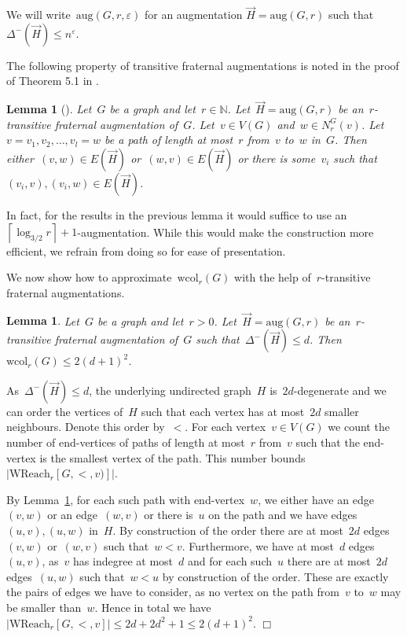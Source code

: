 \documentclass[11pt]{article}
\newtheorem{lemma}[theorem]{Lemma}
\numberwithin{equation}{section}
\newcommand{\N}{{\mathbb N}} \newcommand{\Q}{{\mathbb Q}}
\newcommand{\aug}{\mathrm{aug}}
\newcommand{\wcol}{\mathrm{wcol}}
\newcommand{\wreach}{\mathrm{WReach}}
\renewcommand{\epsilon}{\varepsilon}
\def\qed{\hspace*{\fill}$\Box$}
\newenvironment{proof}[1][]%
{\ifthenelse{\equal{#1}{}}{\noindent\textit{Proof.
    }}{\noindent\textit{#1. }}}%
{\qed\par\smallskip}
\begin{document}
We will write~$\aug(G,r,\epsilon)$ for an augmentation
$\vec{H}=\aug(G,r)$ such that~$\Delta^-(\vec{H})\leq n^\epsilon$.

The following property of transitive fraternal augmentations is noted
in the proof of Theorem 5.1 in \cite{NesetrilO05}.

\begin{lemma}[\cite{NesetrilO05}]\label{thm:augmentationneighbourhood}
  Let~$G$ be a graph and let~$r\in\N$. Let~$\vec{H}=\aug(G,r)$ be
  an~$r$-transitive fraternal augmentation of~$G$. Let~$v\in V(G)$
  and~$w\in N_r^G(v)$. Let~$v=v_1, v_2,\ldots, v_l=w$ be a path of
  length at most~$r$ from~$v$ to~$w$ in~$G$. Then either~$(v,w)\in
  E(\vec{H})$ or~$(w,v)\in E(\vec{H})$ or there is some~$v_i$ such
  that~$(v_i,v), (v_i,w) \in E(\vec{H})$.
\end{lemma}

In fact, for the results in the previous lemma it would suffice to
use an~$\left\lceil \log_{3/2} r\right\rceil+1$-augmentation. While
this would make the construction more efficient, we refrain from doing
so for ease of presentation.

We now show how to approximate~$\wcol_r(G)$ with the help
of~$r$-transitive fraternal augmentations.

\begin{lemma}\label{thm:approximatingcol}
  Let~$G$ be a graph and let~$r>0$. Let~$\vec{H}=\aug(G,r)$ be
  an~$r$-transitive fraternal augmentation of~$G$ such
  that~$\Delta^-(\vec{H})\leq d$. Then~$\wcol_r(G)\leq 2(d+1)^2$.
\end{lemma}

\begin{proof}
  As~$\Delta^-(\vec{H})\leq d$, the underlying undirected graph~$H$
  is~$2d$-degenerate and we can order the vertices of~$H$ such that
  each vertex has at most~$2d$ smaller neighbours. Denote this order
  by~$<$. For each vertex~$v\in V(G)$ we count the number of
  end-vertices of paths of length at most~$r$ from~$v$ such that the
  end-vertex is the smallest vertex of the path. This number
  bounds~$|\wreach_r[G,<, v)]|$.

  By Lemma~\ref{thm:augmentationneighbourhood}, for each such path
  with end-vertex~$w$, we either have an edge~$(v,w)$ or an
  edge~$(w,v)$ or there is~$u$ on the path and we have edges~$(u,v),
  (u,w)$ in~$H$. By construction of the order there are at most~$2d$
  edges~$(v,w)$ or~$(w,v)$ such that~$w<v$. Furthermore, we have at
  most~$d$ edges~$(u,v)$, as~$v$ has indegree at most~$d$ and for each
  such~$u$ there are at most~$2d$ edges~$(u,w)$ such that~$w< u$ by
  construction of the order. These are exactly the pairs of edges we
  have to consider, as no vertex on the path from~$v$ to~$w$ may be
  smaller than~$w$.  Hence in total we have~$|\wreach_r[G,<,v]|\leq
  2d+2d^2+1\leq 2(d+1)^2$.
\end{proof}
\end{document}
